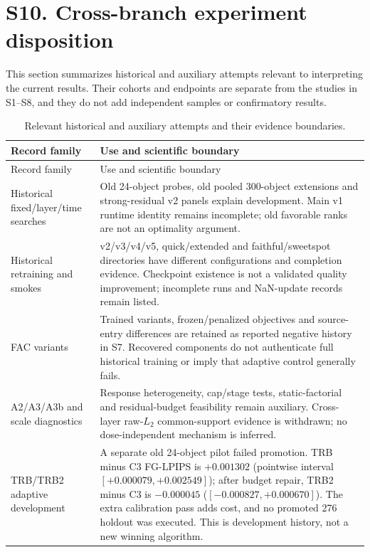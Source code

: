 \documentclass[11pt]{article}
\begin{document}
\clearpage
\section*{S10. Cross-branch experiment disposition}
This section summarizes historical and auxiliary attempts relevant to interpreting the current results. Their cohorts and endpoints are separate from the studies in S1--S8, and they do not add independent samples or confirmatory results.

\begingroup\small
\begin{longtable}{p{3.3cm}p{10.3cm}}
\caption{Relevant historical and auxiliary attempts and their evidence boundaries.}\\
\toprule Record family & Use and scientific boundary \\
\midrule\endfirsthead
\toprule Record family & Use and scientific boundary \\
\midrule\endhead
Historical fixed/layer/time searches & Old 24-object probes, old pooled 300-object extensions and strong-residual v2 panels explain development. Main v1 runtime identity remains incomplete; old favorable ranks are not an optimality argument. \\
Historical retraining and smokes & v2/v3/v4/v5, quick/extended and faithful/sweetspot directories have different configurations and completion evidence. Checkpoint existence is not a validated quality improvement; incomplete runs and NaN-update records remain listed. \\
FAC variants & Trained variants, frozen/penalized objectives and source-entry differences are retained as reported negative history in S7. Recovered components do not authenticate full historical training or imply that adaptive control generally fails. \\
A2/A3/A3b and scale diagnostics & Response heterogeneity, cap/stage tests, static-factorial and residual-budget feasibility remain auxiliary. Cross-layer raw-$L_2$ common-support evidence is withdrawn; no dose-independent mechanism is inferred. \\
TRB/TRB2 adaptive development & A separate old 24-object pilot failed promotion. TRB minus C3 FG-LPIPS is $+0.001302$ (pointwise interval $[+0.000079,+0.002549]$); after budget repair, TRB2 minus C3 is $-0.000045$ ($[-0.000827,+0.000670]$). The extra calibration pass adds cost, and no promoted 276 holdout was executed. This is development history, not a new winning algorithm. \\

\end{longtable}
\end{document}
